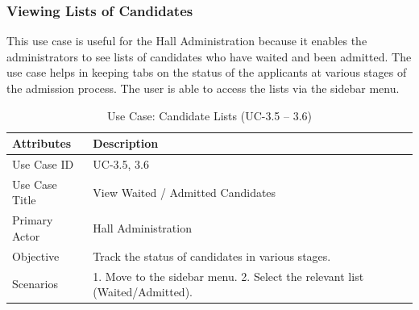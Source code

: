 \subsubsection{Viewing Lists of Candidates}

This use case is useful for the Hall Administration because it enables the administrators to see lists of candidates who have waited and been admitted. The use case helps in keeping tabs on the status of the applicants at various stages of the admission process. The user is able to access the lists via the sidebar menu.

\begin{table}[H]
    \centering
    \small
    \renewcommand{\arraystretch}{1.4}
    \caption{Use Case: Candidate Lists (UC-3.5 – 3.6)}
    \label{tab:candidate_lists_hall}
    
    \begin{tabularx}{\textwidth}{|l|X|}
        \hline
        \rowcolor[gray]{0.9} {Attributes} & {Description} \\ \hline
        Use Case ID & UC-3.5, 3.6 \\ \hline
        Use Case Title & View Waited / Admitted Candidates \\ \hline
        Primary Actor & Hall Administration \\ \hline
        Objective & Track the status of candidates in various stages. \\ \hline
        Scenarios & 1. Move to the sidebar menu. 2. Select the relevant list (Waited/Admitted). \\ \hline
    \end{tabularx}
\end{table}
\FloatBarrier